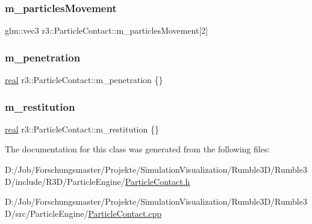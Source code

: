 \mbox{\label{classr3_1_1_particle_contact_a07cacabf6612218466b393091db97ec6}} 
\subsubsection{\texorpdfstring{m\+\_\+particles\+Movement}{m\_particlesMovement}}
{\footnotesize\ttfamily glm\+::vec3 r3\+::\+Particle\+Contact\+::m\+\_\+particles\+Movement\mbox{[}2\mbox{]}}

\mbox{\label{classr3_1_1_particle_contact_a9c0b9355187b9cb9339f108da11f4244}} 
\subsubsection{\texorpdfstring{m\+\_\+penetration}{m\_penetration}}
{\footnotesize\ttfamily \mbox{\hyperlink{namespacer3_ab2016b3e3f743fb735afce242f0dc1eb}{real}} r3\+::\+Particle\+Contact\+::m\+\_\+penetration \{\}}

\mbox{\label{classr3_1_1_particle_contact_ad5c4ed20d7bed8526d4e9ae918d2f74f}} 
\subsubsection{\texorpdfstring{m\+\_\+restitution}{m\_restitution}}
{\footnotesize\ttfamily \mbox{\hyperlink{namespacer3_ab2016b3e3f743fb735afce242f0dc1eb}{real}} r3\+::\+Particle\+Contact\+::m\+\_\+restitution \{\}}



The documentation for this class was generated from the following files\+:\begin{DoxyCompactItemize}
\item 
D\+:/\+Job/\+Forschungsmaster/\+Projekte/\+Simulation\+Visualization/\+Rumble3\+D/\+Rumble3\+D/include/\+R3\+D/\+Particle\+Engine/\mbox{\hyperlink{_particle_contact_8h}{Particle\+Contact.\+h}}\item 
D\+:/\+Job/\+Forschungsmaster/\+Projekte/\+Simulation\+Visualization/\+Rumble3\+D/\+Rumble3\+D/src/\+Particle\+Engine/\mbox{\hyperlink{_particle_contact_8cpp}{Particle\+Contact.\+cpp}}\end{DoxyCompactItemize}
